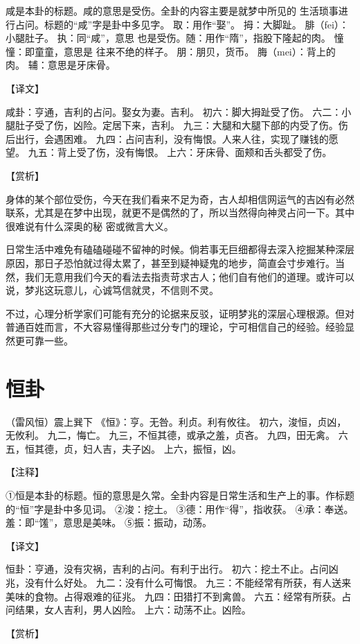 \documentclass[12pt,UTF8]{ctexbook}
\begin{document}
咸是本卦的标题。咸的意思是受伤。全卦的内容主要是就梦中所见的 生活琐事进行占问。标题的“咸”字是卦中多见字。
取：用作“娶”。
拇：大脚趾。
腓（fei）：小腿肚子。
执：同“咸”，意思 也是受伤。随：用作“隋”，指股下隆起的肉。
憧憧：即童童，意思是 往来不绝的样子。
朋：朋贝，货币。
脢（mei）：背上的肉。
辅：意思是牙床骨。

【译文】

咸卦：亨通，吉利的占问。娶女为妻。吉利。
初六：脚大拇趾受了伤。
六二：小腿肚子受了伤，凶险。定居下来，吉利。
九三：大腿和大腿下部的内受了伤。伤后出行，会遇困难。
九四：占问吉利，没有悔恨。人来人往，实现了赚钱的愿望。
九五：背上受了伤，没有悔恨。
上六：牙床骨、面颊和舌头都受了伤。

【赏析】

身体的某个部位受伤，今天在我们看来不足为奇，古人却相信网运气的吉凶有必然联系，尤其是在梦中出现，就更不是偶然的了，所以当然得向神灵占问一下。其中很难说有什么深奥的秘 密或微言大义。

日常生活中难免有磕磕碰碰不留神的时候。倘若事无巨细都得去深入挖掘某种深层原因，那日子恐怕就过得太累了，甚至到疑神疑鬼的地步，简直会寸步难行。当然，我们无意用我们今天的看法去指责苛求古人；他们自有他们的道理。或许可以说，梦兆这玩意儿，心诚笃信就灵，不信则不灵。

不过，心理分析学家们可能有充分的论据来反驳，证明梦兆的深层心理根源。但对普通百姓而言，不大容易懂得那些过分专门的理论，宁可相信自己的经验。经验显然更可靠一些。

\chapter{恒卦}

（雷风恒）震上巽下
《恒》：亨。无咎。利贞。利有攸往。
初六，浚恒，贞凶，无攸利。
九二，悔亡。
九三，不恒其德，或承之羞，贞吝。
九四，田无禽。
六五，恒其德，贞，妇人吉，夫子凶。
上六，振恒，凶。

【注释】

①恒是本卦的标题。恒的意思是久常。全卦内容是日常生活和生产上的事。作标题的“恒”字是卦中多见词。
②浚：挖土。
③德：用作“得”，指收获。
④承：奉送。羞：即“馐”，意思是美味。
⑤振：振动，动荡。

【译文】

恒卦：亨通，没有灾祸，吉利的占问。有利于出行。
初六：挖土不止。占问凶兆，没有什么好处。
九二：没有什么可悔恨。
九三：不能经常有所获，有人送来美味的食物。占得艰难的征兆。
九四：田猎打不到禽兽。
六五：经常有所获。占问结果，女人吉利，男人凶险。
上六：动荡不止。凶险。

【赏析】
\end{document}
